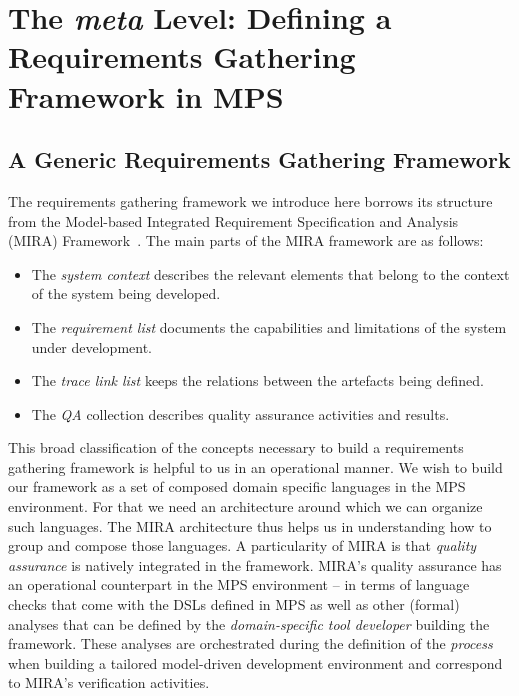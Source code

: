 \section{The \emph{meta} Level: Defining a Requirements Gathering Framework in
MPS}
\label{sec:meta}
\vspace{-.3cm}
\subsection{A Generic Requirements Gathering Framework}
\label{sec:generic_req_fram}
\vspace{-.3cm}
The requirements gathering framework we introduce here borrows its
structure from the Model-based Integrated Requirement Specification and Analysis (MIRA)
Framework~\cite{MIRA13,AF315}. The main parts of the MIRA framework are
as follows:
\vspace{-.1cm}
\begin{itemize}
  \item The \emph{system context} describes the relevant elements that belong
  to the context of the system being developed.
  \item The \emph{requirement list} documents the capabilities and limitations
  of the system under development.
  \item The \emph{trace link list} keeps the relations between the artefacts
  being defined.
  \item The \emph{QA} collection describes quality assurance activities and
  results.
\end{itemize}
\vspace{-.1cm}
This broad classification of the concepts necessary to build a requirements
gathering framework is helpful to us in an operational manner. We wish to build
our framework as a set of composed domain specific languages in the MPS
environment. For that we need an architecture around which we can organize such
languages. The MIRA architecture thus helps us in understanding how to group and
compose those languages. A particularity of MIRA is that \emph{quality
assurance} is natively integrated in the framework. MIRA's quality assurance
has an operational counterpart in the MPS environment -- in terms of
language checks that come with the DSLs defined in MPS as well as other (formal)
analyses that can be defined by the \emph{domain-specific tool developer}
building the framework. These analyses are orchestrated during the definition of
the \emph{process} when building a tailored model-driven development environment
and correspond to MIRA's verification activities.\vspace{-.8cm}
